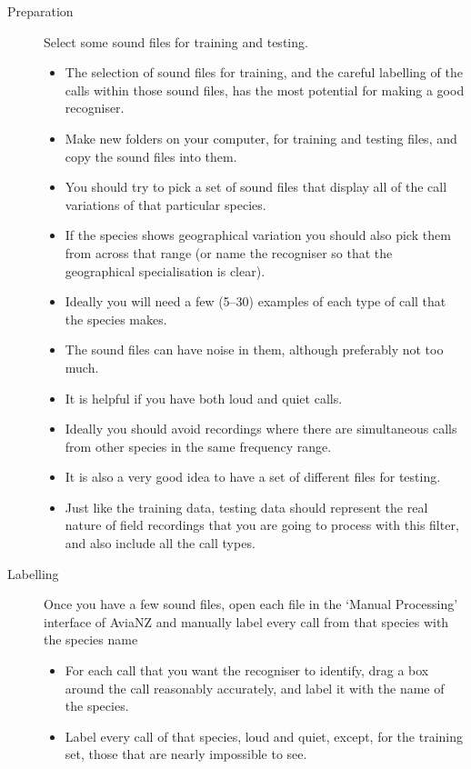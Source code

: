 \documentclass{article}
\begin{document}
\begin{description}
\item[Preparation] Select some sound files for training and testing. 
\begin{itemize}
\item The selection of sound files for training, and the careful labelling of the calls within those sound files, has the most potential for making a good recogniser. 
\item Make new folders on your computer, for training and testing files, and copy the sound files into them.
\item You should try to pick a set of sound files that display all of the call variations of that particular species. 
\item If the species shows geographical variation you should also pick them from across that range (or name the recogniser so that the geographical specialisation is clear).  
\item Ideally you will need a few (5--30) examples of each type of call that the species makes. 
\item The sound files can have noise in them, although preferably not too much. 
\item It is helpful if you have both loud and quiet calls. 
\item Ideally you should avoid recordings where there are simultaneous calls from other species in the same frequency range. 
\item It is also a very good idea to have a set of different files for testing. %
\item Just like the training data, testing data should represent the real nature of field recordings that you are going to process with this filter, and also include all the call types.
\end{itemize}
\item[Labelling] Once you have a few sound files, open each file in the `Manual Processing' interface of AviaNZ and manually label every call from that species with the species name
\begin{itemize}
\item For each call that you want the recogniser to identify, drag a box around the call reasonably accurately, and label it with the name of the species.
\item Label every call of that species, loud and quiet, except, for the training set, those that are nearly impossible to see.

\end{itemize}
\end{description}
\end{document}
